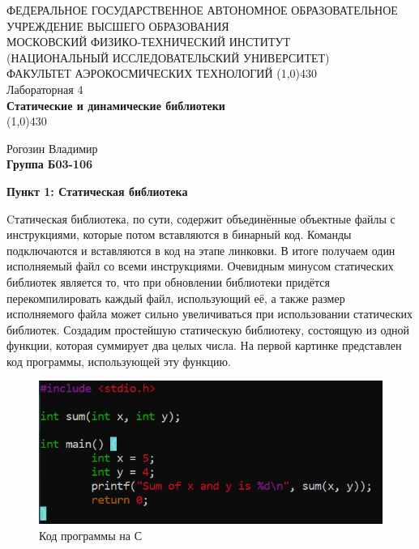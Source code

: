 \documentclass[a4paper,12pt]{article}
\begin{document}
\begin{titlepage}
\begin{center}
\large{\small ФЕДЕРАЛЬНОЕ ГОСУДАРСТВЕННОЕ АВТОНОМНОЕ ОБРАЗОВАТЕЛЬНОЕ\\ УЧРЕЖДЕНИЕ ВЫСШЕГО ОБРАЗОВАНИЯ \\ МОСКОВСКИЙ ФИЗИКО-ТЕХНИЧЕСКИЙ ИНСТИТУТ\\ (НАЦИОНАЛЬНЫЙ ИССЛЕДОВАТЕЛЬСКИЙ УНИВЕРСИТЕТ)\\ ФАКУЛЬТЕТ АЭРОКОСМИЧЕСКИХ ТЕХНОЛОГИЙ}
\vfill
\line(1,0){430}\\[1mm]
\huge{Лабораторная 4}\\
\huge\textbf{Статические и динамические библиотеки}\\
\line(1,0){430}\\[1mm]
\vfill
\begin{flushright}
\normalsize{Рогозин Владимир}\\
\normalsize{\textbf{Группа Б03-106}}\\
\end{flushright}
\end{center}
\end{titlepage}

\textbf{Пункт 1: Статическая библиотека}

Cтатическая библиотека, по сути, содержит объединённые объектные файлы с инструкциями, которые потом вставляются в бинарный код. Команды подключаются и вставляются в код на этапе линковки. В итоге получаем один исполняемый файл со всеми инструкциями. Очевидным минусом статических библиотек является то, что при обновлении библиотеки придётся перекомпилировать каждый файл, использующий её, а также размер исполняемого файла может сильно увеличиваться при использовании статических библиотек. Создадим простейшую статическую библиотеку, состоящую из одной функции, которая суммирует два целых числа. На первой картинке представлен код программы, использующей эту функцию.
\begin{figure}[H]\label{fig: statCode64}
    \centering
    \includegraphics[width = 0.8 \textwidth]{Код использующий стат библиотеку.png}
    \caption{Код программы на С}
\end{figure}
\end{document}
